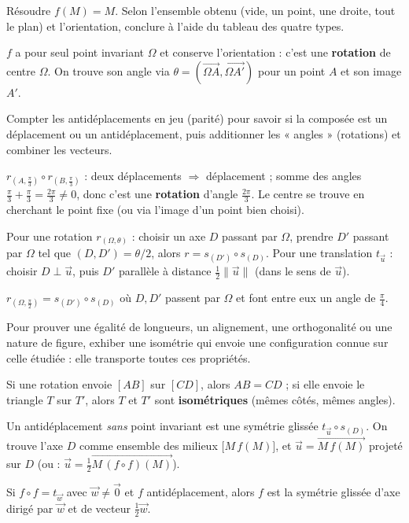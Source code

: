 Résoudre $f(M)=M$. Selon l'ensemble obtenu (vide, un point, une droite, tout le plan) et l'orientation, conclure à l'aide du tableau des quatre types.
\begin{exemple}
$f$ a pour seul point invariant $\Omega$ et conserve l'orientation : c'est une \textbf{rotation} de centre $\Omega$. On trouve son angle via $\theta=(\overrightarrow{\Omega A},\overrightarrow{\Omega A'})$ pour un point $A$ et son image $A'$.
\end{exemple}

Compter les antidéplacements en jeu (parité) pour savoir si la composée est un déplacement ou un antidéplacement, puis additionner les « angles » (rotations) et combiner les vecteurs.
\begin{exemple}
$r_{(A,\frac\pi3)}\circ r_{(B,\frac\pi3)}$ : deux déplacements $\Rightarrow$ déplacement ; somme des angles $\frac\pi3+\frac\pi3=\frac{2\pi}3\neq0$, donc c'est une \textbf{rotation} d'angle $\frac{2\pi}3$. Le centre se trouve en cherchant le point fixe (ou via l'image d'un point bien choisi).
\end{exemple}

Pour une rotation $r_{(\Omega,\theta)}$ : choisir un axe $D$ passant par $\Omega$, prendre $D'$ passant par $\Omega$ tel que $(D,D')=\theta/2$, alors $r=s_{(D')}\circ s_{(D)}$. Pour une translation $t_{\vec u}$ : choisir $D\perp\vec u$, puis $D'$ parallèle à distance $\tfrac12\|\vec u\|$ (dans le sens de $\vec u$).
\begin{exemple}
$r_{(\Omega,\frac\pi2)}=s_{(D')}\circ s_{(D)}$ où $D,D'$ passent par $\Omega$ et font entre eux un angle de $\frac\pi4$.
\end{exemple}

Pour prouver une égalité de longueurs, un alignement, une orthogonalité ou une nature de figure, exhiber une isométrie qui envoie une configuration connue sur celle étudiée : elle transporte toutes ces propriétés.
\begin{exemple}
Si une rotation envoie $[AB]$ sur $[CD]$, alors $AB=CD$ ; si elle envoie le triangle $T$ sur $T'$, alors $T$ et $T'$ sont \textbf{isométriques} (mêmes côtés, mêmes angles).
\end{exemple}

Un antidéplacement \emph{sans} point invariant est une symétrie glissée $t_{\vec u}\circ s_{(D)}$. On trouve l'axe $D$ comme ensemble des milieux $\big[M\,f(M)\big]$, et $\vec u=\overrightarrow{M\,f(M)}$ projeté sur $D$ (ou : $\vec u=\tfrac12\overrightarrow{M\,(f\circ f)(M)}$).
\begin{exemple}
Si $f\circ f=t_{\vec w}$ avec $\vec w\neq\vec0$ et $f$ antidéplacement, alors $f$ est la symétrie glissée d'axe dirigé par $\vec w$ et de vecteur $\tfrac12\vec w$.
\end{exemple}

